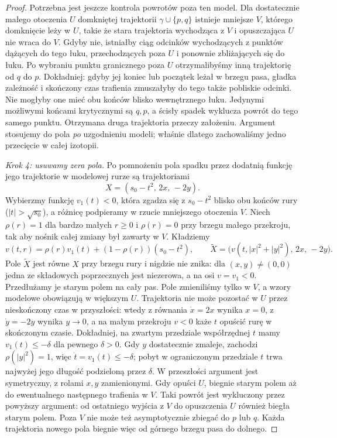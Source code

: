 \begin{proof}
Potrzebna jest jeszcze kontrola powrotów poza ten model.
Dla dostatecznie małego otoczenia $U$ domkniętej trajektorii
$\gamma\cup\{p,q\}$ istnieje mniejsze $V$, którego domknięcie
leży w $U$, takie że stara trajektoria wychodząca z $V$
i opuszczająca $U$ nie wraca do $V$.
Gdyby nie, istniałby ciąg odcinków wychodzących
z punktów dążących do tego łuku, przechodzących poza $U$
i ponownie zbliżających się do łuku.
Po wybraniu punktu granicznego poza $U$ otrzymalibyśmy
inną trajektorię od $q$ do $p$.
Dokładniej: gdyby jej koniec lub początek leżał
w brzegu pasa, gładka zależność i skończony czas
trafienia zmuszałyby do tego także pobliskie odcinki.
Nie mogłyby one mieć obu końców blisko wewnętrznego łuku.
Jedynymi możliwymi końcami krytycznymi są $q,p$,
a ścisły spadek wyklucza powrót do tego samego punktu.
Otrzymana druga trajektoria przeczy założeniu.
Argument stosujemy do pola \emph{po} uzgodnieniu modeli;
właśnie dlatego zachowaliśmy jedno przecięcie w całej izotopii.

\emph{Krok 4: usuwamy zera pola.}
Po pomnożeniu pola spadku przez
dodatnią funkcję jego trajektorie
w modelowej rurze są trajektoriami
\[
 X=(s_0-t^2,\,2x,\,-2y).
\]
Wybierzmy funkcję $v_1(t)<0$,
która zgadza się z $s_0-t^2$
blisko obu końców rury
($|t|>\sqrt{s_0}$), a różnicę podpieramy
w rzucie mniejszego otoczenia $V$. Niech
$\rho(r)=1$ dla bardzo małych
$r\geq0$ i $\rho(r)=0$ przy
brzegu małego przekroju, tak aby nośnik całej
zmiany był zawarty w $V$. Kładziemy
\[
 v(t,r)=\rho(r)v_1(t)
       +(1-\rho(r))(s_0-t^2),\qquad
 \widetilde X=
 \bigl(v(t,|x|^2+|y|^2),\,2x,\,-2y\bigr).
\]
Pole $\widetilde X$ jest równe $X$
przy brzegu rury i nigdzie nie
znika: dla $(x,y)\ne(0,0)$ jedna
ze składowych poprzecznych jest
niezerowa, a na osi $v=v_1<0$.
Przedłużamy je starym polem na cały pas.
Pole zmieniliśmy tylko w $V$, a wzory modelowe
obowiązują w większym $U$. Trajektoria nie może
pozostać w $U$ przez nieskończony czas
w przyszłości: wtedy z równania
$\dot x=2x$ wynika $x=0$,
z $\dot y=-2y$ wynika $y\to0$,
a na małym przekroju $v<0$
każe $t$ opuścić rurę w skończonym
czasie. Dokładniej, na zwartym przedziale współrzędnej $t$
mamy $v_1(t)\leq-\delta$ dla pewnego $\delta>0$.
Gdy $y$ dostatecznie zmaleje, zachodzi $\rho(|y|^2)=1$,
więc $\dot t=v_1(t)\leq-\delta$; pobyt w ograniczonym
przedziale $t$ trwa najwyżej jego długość podzieloną przez $\delta$.
W przeszłości argument
jest symetryczny, z rolami $x,y$
zamienionymi. Gdy opuści $U$, biegnie starym polem
aż do ewentualnego następnego trafienia w $V$.
Taki powrót jest wykluczony przez powyższy argument:
od ostatniego wyjścia z $V$ do opuszczenia $U$
również biegła starym polem. Poza $V$ nie może
też asymptotycznie zbiegać do $p$ lub $q$.
Każda trajektoria nowego pola biegnie więc od górnego
brzegu pasa do dolnego.


\end{proof}
